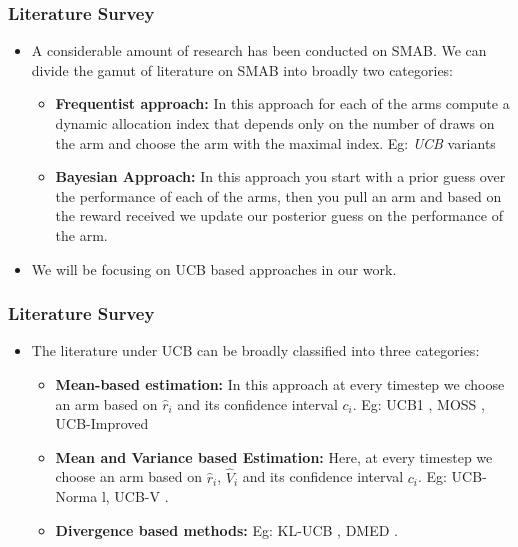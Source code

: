\begin{frame}
\frametitle{Literature Survey}
\begin{itemize}
\item<1-> A considerable amount of research has been conducted on SMAB. We can divide the gamut of literature on SMAB into broadly two categories:
\begin{itemize}
\item<2-> \textbf{Frequentist approach:} In this approach for each of the arms compute a dynamic allocation index that depends only on the number of draws on the arm and choose the arm with the maximal index. Eg:  \emph{UCB} variants
\item<3-> \textbf{Bayesian Approach:} In this approach you start with a prior guess over the performance of each of the arms, then you pull an arm and based on the reward received we update our posterior guess on the performance of the arm. 
\end{itemize} 
\item<4-> We will be focusing on UCB based approaches in our work.
\end{itemize}
\end{frame}

\begin{frame}
\frametitle{Literature Survey}
\begin{itemize}
\item<1-> The literature under UCB can be broadly classified into three categories:
\begin{itemize}
\item<2-> \textbf{Mean-based estimation: } In this approach at every timestep we choose an arm based on $\hat{r}_i$ and its confidence interval $c_i$. Eg: UCB1 \cite{auer2002finite}, MOSS \cite{audibert2009minimax}, UCB-Improved \cite{auer2010ucb}
\item<3-> \textbf{Mean and Variance based Estimation: } Here, at every timestep we choose an arm based on $\hat{r}_i$, $\hat{V}_i$ and its confidence interval $c_i$. Eg: UCB-Norma \cite{auer2002finite}l, UCB-V \cite{audibert2009exploration}.
\item<4-> \textbf{Divergence based methods: } Eg: KL-UCB \cite{garivier2011kl}, DMED \cite{honda2010asymptotically}.
\end{itemize}
\end{itemize} 
\end{frame}